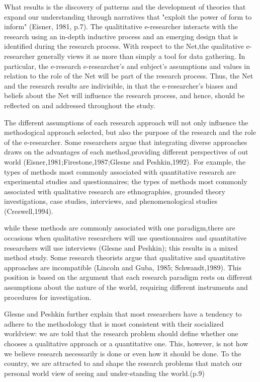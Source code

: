\documentclass[12pt]{beamer}
\begin{document}
 \begin{frame}
What results is the discovery of patterns and the development of theories that expand our understanding through narratives that "exploit the power of form to inform" (Eisner, 1981, p.7).
 The qualititative e-researcher interacts with the research using an in-depth inductive process and an emerging design that is identified during the research process. With respect to the Net,the qualitative e-researcher generally views it as more than simply a tool for data gathering. In particular, the e-research e-researcher's and subject's assumptions and values in relation to the role of the Net will be part of the research process. Thus, the Net and the research results are indivisible, in that the e-researcher's biases and beliefs about the Net will influence the research process, and hence, should be reflected on and addressed throughout the study.
\end{frame}
 \begin{frame}
  The different assumptions of each research approach will not only influence the methodogical approach selected, but also the purpose of the research and the role of the e-researcher. Some researchers argue that integrating diverse approaches draws on the advantages of each method,providing different perspectives of out world (Eisner,1981;Firestone,1987;Glesne and Peshkin,1992).
 For example, the types of methods most commonly associated with quantitative research are experimental studies and questionnaires; the types of methods most commonly associated with qualitative research are ethnographies, grounded theory investigations, case studies, interviews, and phenomenological studies (Creswell,1994).
\end{frame}
 \begin{frame}
while these methods are commonly associated with one paradigm,there are occasions when qualitative researchers will use questionnaires and quantitative researchers will use interviews (Glesne and Peshkin); this results in a mixed method study.
 Some research theorists argue that qualitative and quantitative approaches are incompatible (Lincoln and Guba, 1985; Schwandt,1989). This position is based on the argument that each research paradigm rests on different assumptions about the nature of the world, requiring different instruments and procedures for investigation.
\end{frame}
\begin{frame}
 Glesne and Peshkin further explain that most researchers have a tendency to adhere to the methodology that is most consistent with their socialized worldview:
we are told that the research problem should define whether one chooses a qualitative approach or a quantitative one.
 This, however, is not how we believe research necessarily is done or even how it should be done.
To the country, we are attracted to and shape the research problems that match our personal world view of seeing and under-standing the world.(p.9)
\end{frame}
\end{document}
